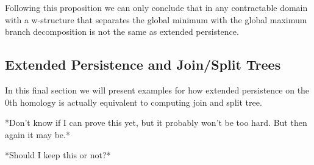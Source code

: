 Following this proposition we can only conclude that in any contractable domain with a w-structure that separates the global minimum with the global maximum branch decomposition is not the same as extended persistence.

\subsection{Extended Persistence and Join/Split Trees}

In this final section we will present examples for how extended persistence on the 0th homology is actually equivalent to computing join and split tree.

*Don't know if I can prove this yet, but it probably won't be too hard. But then again it may be.*

*Should I keep this or not?*







